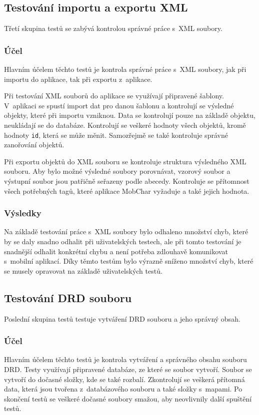 \documentclass[thesis=B,czech]{resources/FITthesis}[2012/06/26]
\begin{document}
		\subsection{Testování importu a exportu XML}
Třetí skupina testů se zabývá kontrolou správné práce s~XML soubory.

			\subsubsection*{Účel}
Hlavním účelem těchto testů je kontrola správné práce s~XML soubory, jak při importu do aplikace, tak při exportu z~aplikace. \par

Při testování XML souborů do aplikace se využívají připravené šablony. V~aplikaci se spustí import dat pro danou šablonu a kontrolují se výsledné objekty, které při importu vzniknou. Data se kontrolují pouze na základě objektu, neukládají se do databáze. Kontrolují se veškeré hodnoty všech objektů, kromě hodnoty \texttt{id}, která se může měnit. Samozřejmě se také kontroluje správné zanořování objektů. \par

Při exportu objektů do XML souboru se kontroluje struktura výsledného XML souboru. Aby bylo možné výsledné soubory porovnávat, vzorový soubor a výstupní soubor jsou patřičně seřazeny podle abecedy. Kontroluje se přítomnost všech potřebných tagů, které aplikace MobChar vyžaduje a také jejich hodnota.

			\subsubsection*{Výsledky}
Na základě testování práce s~XML soubory bylo odhaleno množství chyb, které by se daly snadno odhalit při uživatelských testech, ale při tomto testování je snadnější odhalit konkrétní chybu a není potřeba zdlouhavě komunikovat s~mobilní aplikací. Díky těmto testům bylo výrazně sníženo množství chyb, které se musely opravovat na základě uživatelských testů. 

	\subsection{Testování DRD souboru}
Poslední skupina testů testuje vytváření DRD souboru a jeho správný obsah.

			\subsubsection*{Účel}
Hlavním účelem těchto testů je kontrola vytváření a správného obsahu souboru DRD. Testy využívají připravené databáze, ze které se soubor vytvoří. Soubor se vytvoří do dočasné složky, kde se také rozbalí. Zkontrolují se veškerá přítomná data, která jsou tvořena z~databázového souboru a také složky s~mapami. Po skončení testů se veškeré dočasné soubory smažou, aby neovlivnily další spuštění testů.
\end{document}
